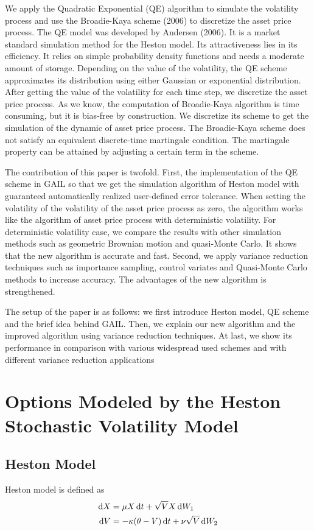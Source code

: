 \documentclass{ws-ijfe}
\begin{document}
We apply the Quadratic Exponential (QE) algorithm to simulate the volatility process and use the Broadie-Kaya scheme (2006) to discretize the asset price process. The QE model was developed by Andersen (2006). It is a market standard simulation method for the Heston model. Its attractiveness lies in its efficiency. It relies on simple probability density functions and needs a moderate amount of storage. Depending on the value of the volatility, the QE scheme approximates its distribution using either Gaussian or exponential distribution. After getting the value of the volatility for each time step, we discretize the asset price process. As we know, the computation of Broadie-Kaya algorithm is time consuming, but it is bias-free by construction. We discretize its scheme to get the simulation of the dynamic of asset price process. The Broadie-Kaya scheme does not satisfy an equivalent discrete-time martingale condition. The martingale property can be attained by adjusting a certain term in the scheme.


The contribution of this paper is twofold. First, the implementation of the QE scheme in GAIL so that we get the simulation algorithm of Heston model with guaranteed automatically realized user-defined error tolerance. When setting the volatility of the volatility of the asset price process as zero, the algorithm works like the algorithm of asset price process with deterministic volatility. For deterministic volatility case, we compare the results with other simulation methods such as geometric Brownian motion and quasi-Monte Carlo. It shows that the new algorithm is accurate and fast. Second, we apply variance reduction techniques such as importance sampling, control variates and Quasi-Monte Carlo methods to increase accuracy. The advantages of the new algorithm is strengthened.


The setup of the paper is as follows: we first introduce Heston model, QE scheme and the brief idea behind GAIL. Then, we explain our new algorithm and the improved algorithm using variance reduction techniques. At last, we show its performance in comparison with various widespread used schemes and with different variance reduction applications

\section{Options Modeled by the Heston Stochastic Volatility Model}
\subsection{Heston Model}
Heston model is defined as
 \begin{align}
    \d X & =\mu X\,\d t+\sqrt{V}X\,\d W_1\label{eq1}\\
    \d V &= -\kappa (\theta-V)\,\d t +\nu\sqrt{V}\,\d W_2\label{eq2}
  \end{align}
\end{document}

